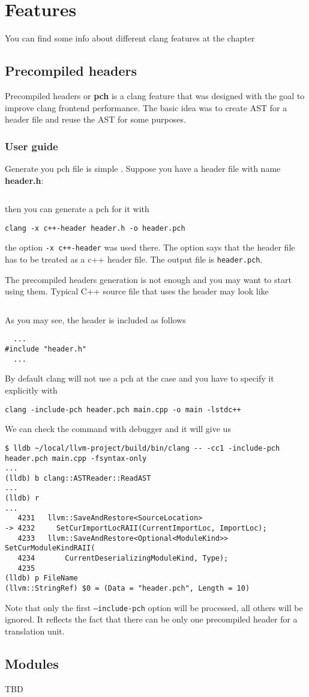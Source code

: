 \chapter{Features}

You can find some info about different clang features at the chapter

\section{Precompiled headers}
Precompiled headers or \textbf{pch} is a clang feature that was
designed with the goal to improve clang frontend performance. The
basic idea was to create AST for a header file and reuse the AST for
some purposes.

\subsection{User guide}
Generate you pch file is simple \cite{clang:user_manual}. Suppose you have a header file with
name \textbf{header.h}:
\inputminted{c++}{./src/pch/simple/header.h} then you can generate a pch for it with
\begin{verbatim}
clang -x c++-header header.h -o header.pch
\end{verbatim}
the option \texttt{-x c++-header} was used there. The option says that
the header file has to be treated as a c++ header file. The output
file is \texttt{header.pch}.

The precompiled headers generation is not enough and you may want to
start using them. Typical C++ source file that uses the header may
look like
\inputminted{c++}{./src/pch/simple/main.cpp}
As you may see, the header is included as follows
\begin{verbatim}
  ...
#include "header.h"
  ...
\end{verbatim}
By default clang will not use a pch at the case and you have to
specify it explicitly with
\begin{verbatim}
clang -include-pch header.pch main.cpp -o main -lstdc++
\end{verbatim}
We can check the command with debugger and it will give us
\begin{verbatim}
$ lldb ~/local/llvm-project/build/bin/clang -- -cc1 -include-pch header.pch main.cpp -fsyntax-only
...
(lldb) b clang::ASTReader::ReadAST                                             
...
(lldb) r
...
   4231   llvm::SaveAndRestore<SourceLocation>
-> 4232     SetCurImportLocRAII(CurrentImportLoc, ImportLoc);
   4233   llvm::SaveAndRestore<Optional<ModuleKind>> SetCurModuleKindRAII(
   4234       CurrentDeserializingModuleKind, Type);
   4235 
(lldb) p FileName
(llvm::StringRef) $0 = (Data = "header.pch", Length = 10)
\end{verbatim}
Note that only the first \texttt{--include-pch} option will be
processed, all others will be ignored. It reflects the fact that there
can be only one precompiled header for a translation unit.

\section{Modules}
TBD

